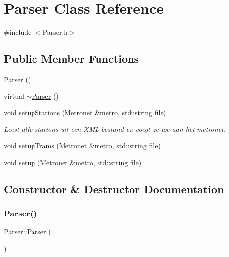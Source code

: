 \hypertarget{class_parser}{}\section{Parser Class Reference}
\label{class_parser}


{\ttfamily \#include $<$Parser.\+h$>$}

\subsection*{Public Member Functions}
\begin{DoxyCompactItemize}
\item 
\hyperlink{class_parser_a12234f6cd36b61af4b50c94a179422c1}{Parser} ()
\item 
virtual \hyperlink{class_parser_a3e658b5917a93a3ef648050d060e3a93}{$\sim$\+Parser} ()
\item 
void \hyperlink{class_parser_a9aa0d57be0166c22c74d2b9a7e5272cb}{setup\+Stations} (\hyperlink{class_metronet}{Metronet} \&metro, std\+::string file)
\begin{DoxyCompactList}\small\item\em Leest alle stations uit een X\+M\+L-\/bestand en voegt ze toe aan het metronet. \end{DoxyCompactList}\item 
void \hyperlink{class_parser_a45cd97dbe3549de6667cb7255f8d51fe}{setup\+Trams} (\hyperlink{class_metronet}{Metronet} \&metro, std\+::string file)
\item 
void \hyperlink{class_parser_a5fc136436324d779fc2cd55825b381cb}{setup} (\hyperlink{class_metronet}{Metronet} \&metro, std\+::string file)
\end{DoxyCompactItemize}


\subsection{Constructor \& Destructor Documentation}
\mbox{\label{class_parser_a12234f6cd36b61af4b50c94a179422c1}} 
\subsubsection{\texorpdfstring{Parser()}{Parser()}}
{\footnotesize\ttfamily Parser\+::\+Parser (\begin{DoxyParamCaption}{ }\end{DoxyParamCaption})}

